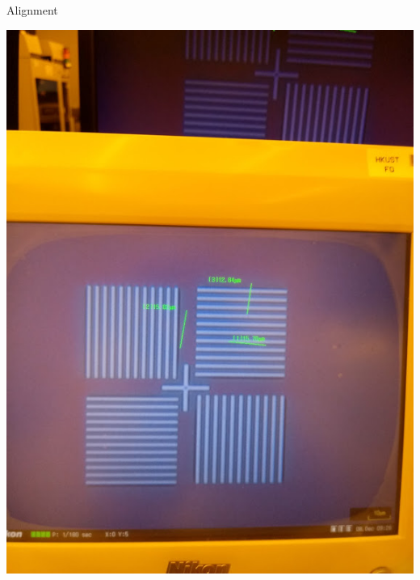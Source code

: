 \documentclass[aspectratio=169]{beamer}
\begin{document}
\begin{frame}{Alignment}
	\begin{center}
		\includegraphics[height=0.8\textheight]{images/20181211_125918.jpg}

\end{center}
\end{frame}
\end{document}
